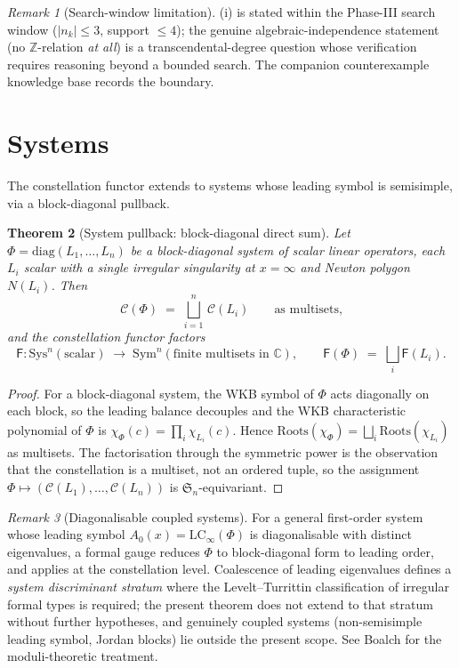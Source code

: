 \documentclass[11pt,a4paper]{article}
\theoremstyle{plain}
\newtheorem{theorem}{Theorem}[section]
\theoremstyle{definition}
\theoremstyle{remark}
\newtheorem{remark}[theorem]{Remark}
\newcommand{\LCinf}{\mathrm{LC}_\infty}
\newcommand{\Roots}{\mathrm{Roots}}
\newcommand{\Cl}{\mathcal{C}}
\newcommand{\Fclass}{\mathsf{F}}
\newcommand{\Sys}{\mathrm{Sys}}
\newcommand{\Sym}{\mathrm{Sym}}
\newcommand{\Symm}{\mathfrak{S}}
\begin{document}
\begin{remark}[Search-window limitation]\label{rem:D2-search}
(i) is stated within the Phase-III search window
($|n_k| \le 3$, support $\le 4$); the genuine algebraic-independence
statement (no $\mathbb{Z}$-relation \emph{at all}) is a
transcendental-degree question whose verification requires reasoning
beyond a bounded search. The companion counterexample knowledge base
\cite[CE-Zres-largecoef]{wkb_dataset_v1} records the boundary.
\end{remark}


\section{Systems}\label{sec:systems}

The constellation functor extends to systems whose leading symbol is
semisimple, via a block-diagonal pullback.

\begin{theorem}[System pullback: block-diagonal direct sum]\label{thm:S1}
Let $\Phi = \mathrm{diag}(L_1, \dots, L_n)$ be a block-diagonal system of
scalar linear operators, each $L_i$ scalar with a single irregular
singularity at $x = \infty$ and Newton polygon $N(L_i)$. Then
\[
   \Cl(\Phi) \;=\; \bigsqcup_{i = 1}^{n}\, \Cl(L_i)
   \qquad \text{as multisets,}
\]
and the constellation functor factors
\[
   \Fclass \colon \Sys^n(\mathrm{scalar}) \;\longrightarrow\;
   \Sym^n(\text{finite multisets in } \mathbb{C}),
   \qquad \Fclass(\Phi) \;=\; \bigsqcup_i \Fclass(L_i).
\]
\end{theorem}

\begin{proof}
For a block-diagonal system, the WKB symbol of $\Phi$ acts diagonally on
each block, so the leading balance decouples and the WKB characteristic
polynomial of $\Phi$ is $\chi_\Phi(c) = \prod_i \chi_{L_i}(c)$. Hence
$\Roots(\chi_\Phi) = \bigsqcup_i \Roots(\chi_{L_i})$ as multisets. The
factorisation through the symmetric power is the observation that the
constellation is a multiset, not an ordered tuple, so the assignment
$\Phi \mapsto (\Cl(L_1), \dots, \Cl(L_n))$ is $\Symm_n$-equivariant.
\end{proof}

\begin{remark}[Diagonalisable coupled systems]\label{rem:S1-diag}
For a general first-order system whose leading symbol $A_0(x) =
\LCinf(\Phi)$ is diagonalisable with distinct eigenvalues, a formal gauge
reduces $\Phi$ to block-diagonal form to leading order, and
 applies at the constellation level. Coalescence of leading
eigenvalues defines a \emph{system discriminant stratum} where the
Levelt--Turrittin classification of irregular formal types is required;
the present theorem does not extend to that stratum without further
hypotheses, and genuinely coupled systems (non-semisimple leading symbol,
Jordan blocks) lie outside the present scope. See Boalch
\cite{boalch-stokes,boalch-wildhodge} for the moduli-theoretic treatment.
\end{remark}
\end{document}
